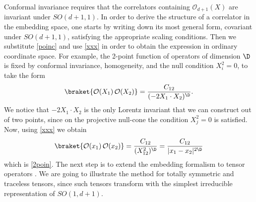 \documentclass[a4paper,11pt,openright,twoside]{book}
\newcommand{\mO}{\mathcal{O}}
\numberwithin{equation}{section}
\begin{document}
Conformal invariance requires that the correlators containing $\mO_{d+1}(X)$ are invariant under $SO(d+1,1)$. 
In order to derive the structure of a correlator in the embedding space, one starts by 
writing down its most general form, covariant under  $SO(d+1,1)$, satisfying the appropriate scaling conditions. Then we substitute \eqref{poinc} and use \eqref{xxx} in order to obtain the expression in ordinary coordinate space. For example, the 2-point function of operators of dimension $\D$ is fixed by conformal invariance, homogeneity, and the null condition $X_i^2=0$, to take the form
\begin{equation}
	\braket{\mO(X_1)\,\mO(X_2)}=\frac{C_{12}}{(-2X_1\cdot X_2)^\D}.
\end{equation}
We notice that $-2X_1\cdot X_2$ is the only Lorentz invariant that we can construct out of two points, since on the projective null-cone the condition $X_j^2=0$ is satisfied. Now, using \eqref{xxx} we obtain
\begin{equation}
	\braket{\mO(x_1)\,\mO(x_2)}=\frac{C_{12}}{(X^2_{12})^\D}=\frac{C_{12}}{|x_1-x_2|^{2\D}}
\end{equation}
which is \eqref{2poin}. 
The next step is to extend the embedding formalism to tensor operators \cite{Ferrara:1973yt,Weinberg:2010fx,Costa:2011mg,SimmonsDuffin:2012uy}. We are going to illustrate the method for totally symmetric and traceless tensors, since such tensors transform with the simplest irreducible representation of $SO(1,d+1)$. 
\end{document}
